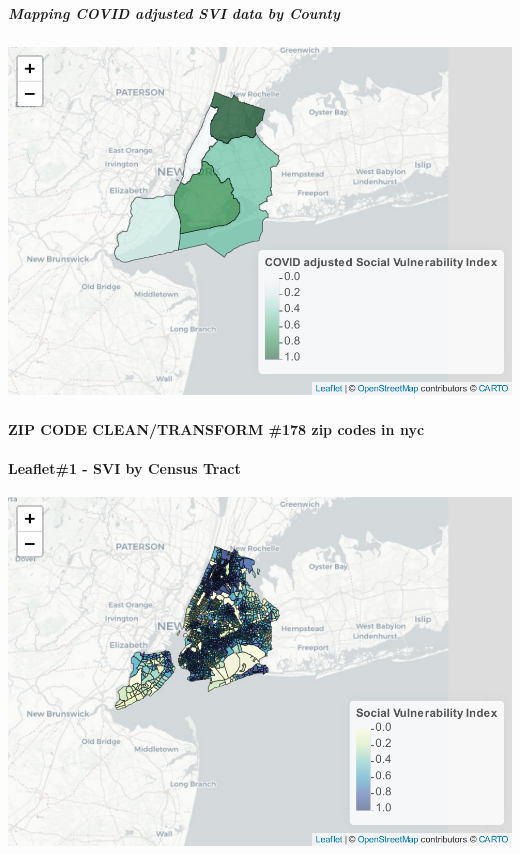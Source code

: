 \documentclass[
]{article}
\begin{document}
\hypertarget{mapping-covid-adjusted-svi-data-by-county}{%
\subparagraph{\texorpdfstring{\textbf{Mapping COVID adjusted SVI data by
County}}{Mapping COVID adjusted SVI data by County}}\label{mapping-covid-adjusted-svi-data-by-county}}

\includegraphics{leaflet_files/figure-latex/unnamed-chunk-7-1.pdf}

\hypertarget{zip-code-cleantransform-178-zip-codes-in-nyc}{%
\paragraph{ZIP CODE CLEAN/TRANSFORM \#178 zip codes in
nyc}\label{zip-code-cleantransform-178-zip-codes-in-nyc}}

\hypertarget{leaflet1---svi-by-census-tract}{%
\paragraph{Leaflet\#1 - SVI by Census
Tract}\label{leaflet1---svi-by-census-tract}}

\includegraphics{leaflet_files/figure-latex/unnamed-chunk-10-1.pdf}
\end{document}

